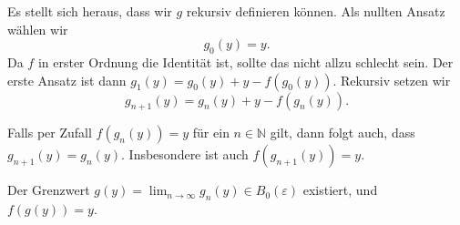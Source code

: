 \documentclass[../main.tex]{subfiles}
\begin{document}
Es stellt sich heraus, dass wir $g$ rekursiv definieren können.
Als nullten Ansatz wählen wir \[g_0(y) = y.\]
Da $f$ in erster Ordnung die Identität ist, sollte das
nicht allzu schlecht sein.
Der erste Ansatz ist dann $g_1(y) = g_0(y) + y - f(g_0(y))$.
Rekursiv setzen wir
\[
  g_{n+1}(y) = g_n(y) + y - f(g_n(y)).
\]

\begin{remark}
  Falls per Zufall $f(g_n(y)) = y$ für ein $n \in \mathbb{N}$ 
  gilt, dann folgt auch, dass
  \(
    g_{n+1}(y) = g_n(y)
  \).
  Insbesondere ist auch $f(g_{n+1}(y)) = y$.
\end{remark}

\begin{claim}
  Der Grenzwert $g(y) = \lim_{n \to \infty} g_n(y) \in B_{0}(\varepsilon)$ 
  existiert, und $f(g(y)) = y$.
\end{claim}
\end{document}
